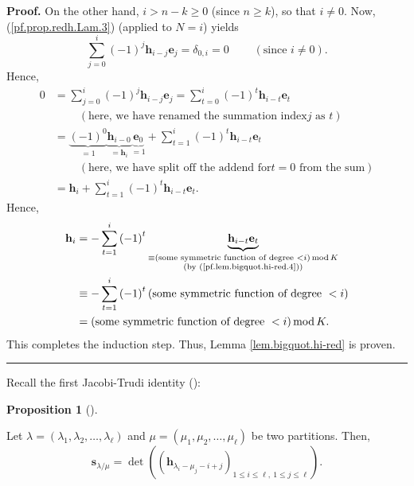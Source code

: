 \documentclass[numbers=enddot,12pt,final,onecolumn,notitlepage]{scrartcl}%
\theoremstyle{definition}
\newtheorem{prop}[theo]{Proposition}
\newenvironment{proposition}[1][]
{\begin{prop}[#1]\begin{leftbar}}
{\end{leftbar}\end{prop}}
\newenvironment{proof}[1][Proof]{\noindent\textbf{#1.} }{\ \rule{0.5em}{0.5em}}
\let\sumnonlimits\sum
\renewcommand{\sum}{\sumnonlimits\limits}
\begin{document}
\begin{proof}
On the other hand, $i>n-k\geq0$ (since $n\geq k$), so that $i\neq0$. Now,
(\ref{pf.prop.redh.Lam.3}) (applied to $N=i$) yields%
\[
\sum_{j=0}^{i}\left(  -1\right)  ^{j}\mathbf{h}_{i-j}\mathbf{e}_{j}%
=\delta_{0,i}=0\ \ \ \ \ \ \ \ \ \ \left(  \text{since }i\neq0\right)  .
\]
Hence,%
\begin{align*}
0  &  =\sum_{j=0}^{i}\left(  -1\right)  ^{j}\mathbf{h}_{i-j}\mathbf{e}%
_{j}=\sum_{t=0}^{i}\left(  -1\right)  ^{t}\mathbf{h}_{i-t}\mathbf{e}_{t}\\
&  \ \ \ \ \ \ \ \ \ \ \left(  \text{here, we have renamed the summation index
}j\text{ as }t\right) \\
&  =\underbrace{\left(  -1\right)  ^{0}}_{=1}\underbrace{\mathbf{h}_{i-0}%
}_{=\mathbf{h}_{i}}\underbrace{\mathbf{e}_{0}}_{=1}+\sum_{t=1}^{i}\left(
-1\right)  ^{t}\mathbf{h}_{i-t}\mathbf{e}_{t}\\
&  \ \ \ \ \ \ \ \ \ \ \left(  \text{here, we have split off the addend for
}t=0\text{ from the sum}\right) \\
&  =\mathbf{h}_{i}+\sum_{t=1}^{i}\left(  -1\right)  ^{t}\mathbf{h}%
_{i-t}\mathbf{e}_{t}.
\end{align*}
Hence,%
\begin{align*}
\mathbf{h}_{i}  &  =-\sum_{t=1}^{i}\left(  -1\right)  ^{t}%
\underbrace{\mathbf{h}_{i-t}\mathbf{e}_{t}}_{\substack{\equiv\left(
\text{some symmetric function of degree }<i\right)  \operatorname{mod}%
K\\\text{(by (\ref{pf.lem.bigquot.hi-red.4}))}}}\\
&  \equiv-\sum_{t=1}^{i}\left(  -1\right)  ^{t}\left(  \text{some symmetric
function of degree }<i\right) \\
&  =\left(  \text{some symmetric function of degree }<i\right)
\operatorname{mod}K.
\end{align*}
This completes the induction step. Thus, Lemma \ref{lem.bigquot.hi-red} is proven.
\end{proof}

Recall the first Jacobi-Trudi identity (\cite[(2.4.16)]{GriRei18}):

\begin{proposition}
\label{prop.jt.h}Let $\lambda=\left(  \lambda_{1},\lambda_{2},\ldots
,\lambda_{\ell}\right)  $ and $\mu=\left(  \mu_{1},\mu_{2},\ldots,\mu_{\ell
}\right)  $ be two partitions. Then,%
\[
\mathbf{s}_{\lambda/\mu}=\det\left(  \left(  \mathbf{h}_{\lambda_{i}-\mu
_{j}-i+j}\right)  _{1\leq i\leq\ell,\ 1\leq j\leq\ell}\right)  .
\]

\end{proposition}
\end{document}
